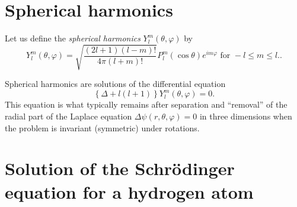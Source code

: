 \section{Spherical harmonics}
\label{2011-m-ch-sfshar}


Let us define the {\em spherical harmonics} $Y_l^m (\theta ,\varphi )$ by
\begin{equation}
Y_l^m (\theta ,\varphi ) =\sqrt{\frac{(2l+1)(l-m)!}{4\pi (l+m)!} }
P_l^m(\cos \theta )e^{im\varphi }\textrm{ for } -l\le m\le l.
.
\label{2014-m-ch-sf-sh}
\end{equation}

Spherical harmonics are solutions of the differential equation
\begin{equation}
\left\{
\Delta + l(l+1)
\right\}
Y_l^m (\theta ,\varphi ) =0
.
\end{equation}
This equation is what typically remains after separation and ``removal'' of the
radial part of the Laplace equation $\Delta \psi(r,\theta ,\varphi)=0$ in three dimensions
when the problem is invariant (symmetric) under rotations.



\section{Solution of the Schr\"odinger equation for a hydrogen atom}


